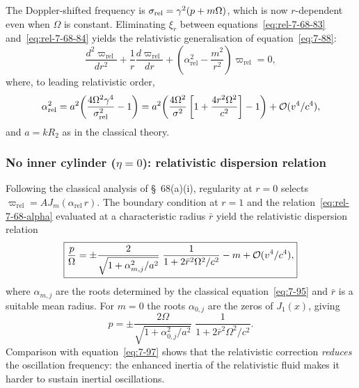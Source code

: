 The Doppler-shifted frequency is $\sigma_{\mathrm{rel}} = \gamma^2(p + m\Omega)$,
which is now $r$-dependent even when $\Omega$ is constant.  Eliminating
$\xi_r$ between equations~\eqref{eq:rel-7-68-83}
and~\eqref{eq:rel-7-68-84} yields the relativistic generalisation of
equation~\eqref{eq:7-88}:
\begin{equation}
\label{eq:rel-7-68-88}
\frac{d^2\varpi_{\mathrm{rel}}}{dr^2}
+\frac{1}{r}\frac{d\varpi_{\mathrm{rel}}}{dr}
+\left(\alpha_{\mathrm{rel}}^2
- \frac{m^2}{r^2}\right)\varpi_{\mathrm{rel}} = 0,
\end{equation}
where, to leading relativistic order,
\begin{equation}
\label{eq:rel-7-68-alpha}
\alpha_{\mathrm{rel}}^2
= a^2\!\left(\frac{4\Omega^2\gamma^4}{\sigma_{\mathrm{rel}}^2}-1\right)
= a^2\!\left(\frac{4\Omega^2}{\sigma^2}
  \left[1 + \frac{4r^2\Omega^2}{c^2}\right] - 1\right)
  + \mathcal{O}(v^4/c^4),
\end{equation}
and $a = kR_2$ as in the classical theory.

\subsubsection{No inner cylinder ($\eta=0$): relativistic dispersion relation}

Following the classical analysis of \S~68(a)(i), regularity at $r=0$
selects $\varpi_{\mathrm{rel}} = AJ_m(\alpha_{\mathrm{rel}}\,r)$.  The boundary
condition at $r = 1$ and the relation~\eqref{eq:rel-7-68-alpha}
evaluated at a characteristic radius $\bar{r}$ yield the relativistic
dispersion relation
\begin{equation}
\label{eq:rel-7-68-disp-eta0}
\boxed{
\frac{p}{\Omega}
= \pm\frac{2}{\sqrt{1+\alpha_{m,j}^2/a^2}}
\;\frac{1}{1 + 2\bar{r}^2\Omega^2/c^2}
- m
+ \mathcal{O}(v^4/c^4),
}
\end{equation}
where $\alpha_{m,j}$ are the roots determined by the classical
equation~\eqref{eq:7-95} and $\bar{r}$ is a suitable mean radius.
For $m = 0$ the roots $\alpha_{0,j}$ are the zeros of $J_1(x)$, giving
\begin{equation}
\label{eq:rel-7-68-disp-m0}
p = \pm\frac{2\Omega}{\sqrt{1+\alpha_{0,j}^2/a^2}}
\;\frac{1}{1 + 2\bar{r}^2\Omega^2/c^2}.
\end{equation}
Comparison with equation~\eqref{eq:7-97} shows that the relativistic
correction \emph{reduces} the oscillation frequency: the enhanced
inertia of the relativistic fluid makes it harder to sustain inertial
oscillations.

